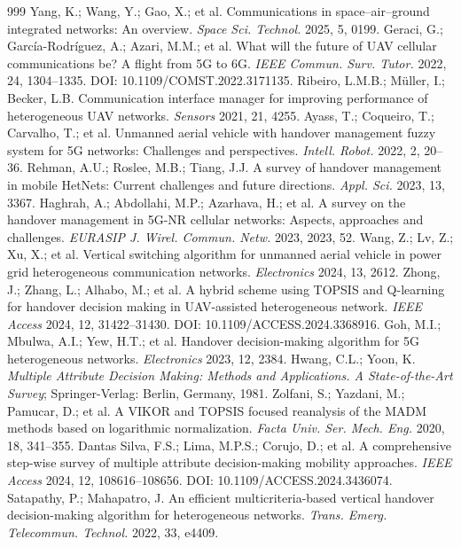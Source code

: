 \documentclass[final,3p,times,twocolumn]{elsarticle}
\begin{document}
\begin{thebibliography}{999}
Yang, K.; Wang, Y.; Gao, X.; et al. Communications in space--air--ground integrated networks: An overview. {\em Space Sci. Technol.} 2025, 5, 0199.
Geraci, G.; García-Rodríguez, A.; Azari, M.M.; et al. What will the future of UAV cellular communications be? A flight from 5G to 6G. {\em IEEE Commun. Surv. Tutor.} 2022, 24, 1304--1335. DOI: 10.1109/COMST.2022.3171135.
Ribeiro, L.M.B.; Müller, I.; Becker, L.B. Communication interface manager for improving performance of heterogeneous UAV networks. {\em Sensors} 2021, 21, 4255.
Ayass, T.; Coqueiro, T.; Carvalho, T.; et al. Unmanned aerial vehicle with handover management fuzzy system for 5G networks: Challenges and perspectives. {\em Intell. Robot.} 2022, 2, 20--36.
Rehman, A.U.; Roslee, M.B.; Tiang, J.J. A survey of handover management in mobile HetNets: Current challenges and future directions. {\em Appl. Sci.} 2023, 13, 3367.
Haghrah, A.; Abdollahi, M.P.; Azarhava, H.; et al. A survey on the handover management in 5G-NR cellular networks: Aspects, approaches and challenges. {\em EURASIP J. Wirel. Commun. Netw.} 2023, 2023, 52.
Wang, Z.; Lv, Z.; Xu, X.; et al. Vertical switching algorithm for unmanned aerial vehicle in power grid heterogeneous communication networks. {\em Electronics} 2024, 13, 2612.
Zhong, J.; Zhang, L.; Alhabo, M.; et al. A hybrid scheme using TOPSIS and Q-learning for handover decision making in UAV-assisted heterogeneous network. {\em IEEE Access} 2024, 12, 31422--31430. DOI: 10.1109/ACCESS.2024.3368916.
Goh, M.I.; Mbulwa, A.I.; Yew, H.T.; et al. Handover decision-making algorithm for 5G heterogeneous networks. {\em Electronics} 2023, 12, 2384.
Hwang, C.L.; Yoon, K. \textit{Multiple Attribute Decision Making: Methods and Applications. A State-of-the-Art Survey}; Springer-Verlag: Berlin, Germany, 1981.
Zolfani, S.; Yazdani, M.; Pamucar, D.; et al. A VIKOR and TOPSIS focused reanalysis of the MADM methods based on logarithmic normalization. {\em Facta Univ. Ser. Mech. Eng.} 2020, 18, 341--355.
Dantas Silva, F.S.; Lima, M.P.S.; Corujo, D.; et al. A comprehensive step-wise survey of multiple attribute decision-making mobility approaches. {\em IEEE Access} 2024, 12, 108616--108656. DOI: 10.1109/ACCESS.2024.3436074.
Satapathy, P.; Mahapatro, J. An efficient multicriteria-based vertical handover decision-making algorithm for heterogeneous networks. {\em Trans. Emerg. Telecommun. Technol.} 2022, 33, e4409.

\end{thebibliography}
\end{document}
